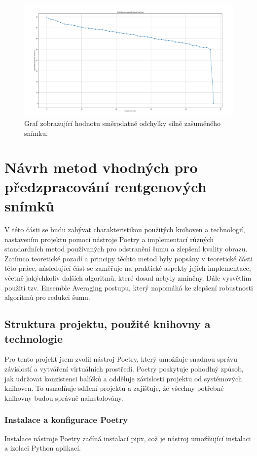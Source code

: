 \documentclass[male,czech,api_ing]{thesis}
\begin{document}
\begin{figure}[h]
    \centering
    \includegraphics[width=\linewidth]{Prilohy/Obrazky/PCA_std_all_three_noise_types.png}
    \caption{Graf zobrazující hodnotu směrodatné odchylky silně zašuměného snímku.}
    \label{fig:PCA_std}
\end{figure}

\section{Návrh metod vhodných pro předzpracování rentgenových snímků}
V této části se budu zabývat charakteristikou použitých knihoven a technologií, nastavením projektu pomocí nástroje Poetry a implementací různých standardních metod používaných pro odstranění šumu a zlepšení kvality obrazu. Zatímco teoretické pozadí a principy těchto metod byly popsány v teoretické části této práce, následující část se zaměřuje na praktické aspekty jejich implementace, včetně jakýchkoliv dalších algoritmů, které dosud nebyly zmíněny. Dále vysvětlím použití tzv. Ensemble Averaging postupu, který napomáhá ke zlepšení robustnosti algoritmů pro redukci šumu.

\subsection{Struktura projektu, použité knihovny a technologie}
Pro tento projekt jsem zvolil nástroj Poetry, který umožňuje snadnou správu závislostí a vytváření virtuálních prostředí. Poetry poskytuje pohodlný způsob, jak udržovat konzistenci balíčků a odděluje závislosti projektu od systémových knihoven. To usnadňuje sdílení projektu a zajišťuje, že všechny potřebné knihovny budou správně nainstalovány.

\subsubsection{Instalace a konfigurace Poetry}
Instalace nástroje Poetry začíná instalací pipx, což je nástroj umožňující instalaci a izolaci Python aplikací. 
\end{document}
